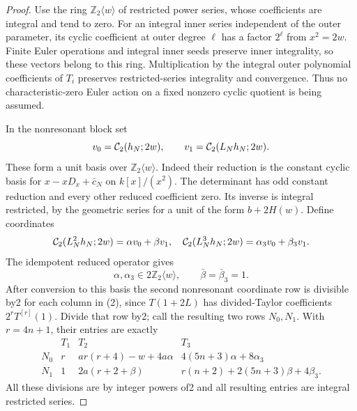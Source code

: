 \documentclass[11pt]{article}
\begin{document}
\begin{proof}
Use the ring $\mathbb Z_2\langle w\rangle$ of restricted power
series, whose coefficients are integral and tend to zero.
For an integral inner series independent of the outer parameter,
its cyclic coefficient at outer degree $\ell$ has a factor $2^\ell$
from $x^2=2w$. Finite Euler operations and integral inner seeds
preserve inner integrality, so these vectors belong to this ring.
Multiplication by the integral outer polynomial coefficients of
$T_i$ preserves restricted-series integrality and convergence. Thus no characteristic-zero Euler action on a
fixed nonzero cyclic quotient is being assumed.

In the nonresonant block set
\[
 v_0={\cal C}_2(h_N;2w),\qquad
 v_1={\cal C}_2(L_Nh_N;2w).
\]
These form a unit basis over $\mathbb Z_2\langle w\rangle$.
Indeed their reduction is the constant cyclic basis for
$x-xD_x+\bar c_N$ on $k[x]/(x^2)$.
The determinant has odd constant reduction and every other reduced
coefficient zero. Its inverse is integral restricted, by the
geometric series for a unit of the form $b+2H(w)$.
Define coordinates
\[
 {\cal C}_2(L_N^2h_N;2w)=\alpha v_0+\beta v_1,\quad
 {\cal C}_2(L_N^3h_N;2w)=\alpha_3v_0+\beta_3v_1.
\]
The idempotent reduced operator gives
\[
 \alpha,\alpha_3\in2\mathbb Z_2\langle w\rangle,\qquad
 \bar\beta=\bar\beta_3=1.                              \tag{5}
\]
After conversion to this basis the second nonresonant coordinate
row is divisible by2 for each column in (2), since
$T(1+2L)$ has divided-Taylor coefficients $2^rT^{[r]}(1)$.
Divide that row by2; call the resulting two rows $N_0,N_1$.
With $r=4n+1$, their entries are exactly
\[
 \begin{array}{c|ccc}
 &T_1&T_2&T_3\\ \hline
 N_0&r&a r(r+4)-w+4a\alpha&
             4(5n+3)\alpha+8\alpha_3\\
 N_1&1&2a(r+2+\beta)&
             r(n+2)+2(5n+3)\beta+4\beta_3 .
 \end{array}                                           \tag{6}
\]
All these divisions are by integer powers of2 and all resulting
entries are integral restricted series.


\end{proof}
\end{document}
